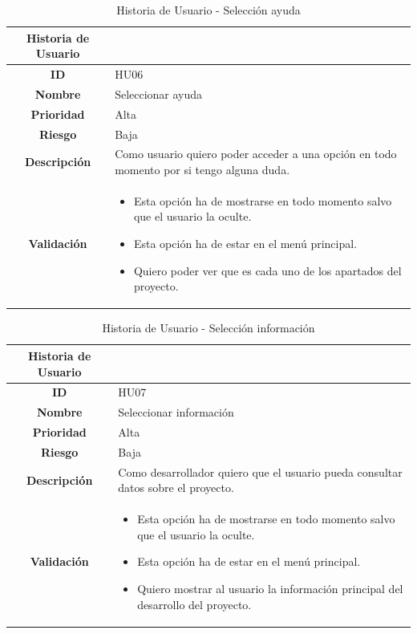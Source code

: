 \begin{table}[H]
	\begin{center}
		\begin{tabular}{| c | p{9cm} |}
			\hline
			
			Historia de Usuario &  \\ \hline
			
			
			\textbf{ID} & HU06 \\
			\textbf{Nombre} & Seleccionar ayuda \\
			\textbf{Prioridad} & Alta \\
			\textbf{Riesgo} & Baja \\
			\textbf{Descripción} & Como usuario quiero poder acceder a una opción en todo momento por si tengo alguna duda. \\
			\textbf{Validación} & \begin{itemize}
				\item Esta opción ha de mostrarse en todo momento salvo que el usuario la oculte.
				\item Esta opción ha de estar en el menú principal.
				\item Quiero poder ver que es cada uno de los apartados del proyecto.
			\end{itemize} \\ \hline
		\end{tabular}
		\caption{Historia de Usuario - Selección ayuda}
	\end{center}
\end{table}

\begin{table}[H]
	\begin{center}
		\begin{tabular}{| c | p{9cm} |}
			\hline
			
			Historia de Usuario &  \\ \hline
			
			
			\textbf{ID} & HU07 \\
			\textbf{Nombre} & Seleccionar información \\
			\textbf{Prioridad} & Alta \\
			\textbf{Riesgo} & Baja \\
			\textbf{Descripción} & Como desarrollador quiero que el usuario pueda consultar datos sobre el proyecto. \\
			\textbf{Validación} & \begin{itemize}
				\item Esta opción ha de mostrarse en todo momento salvo que el usuario la oculte.
				\item Esta opción ha de estar en el menú principal.
				\item Quiero mostrar al usuario la información principal del desarrollo del proyecto.
			\end{itemize} \\ \hline
		\end{tabular}
		\caption{Historia de Usuario - Selección información}
	\end{center}
\end{table}

